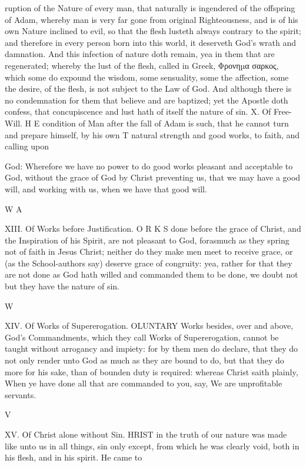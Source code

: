 ruption of the Nature of every man, that naturally is ingendered of the offspring of Adam, whereby man is very far gone from original Righteousness, and is of his own Nature inclined to evil, so that the flesh lusteth always contrary to the spirit; and therefore in every person born into this world, it deserveth God’s wrath and damnation. And this infection of nature doth remain, yea in them that are regenerated; whereby the lust of the flesh, called in Greek, Φρονηµα σαρκος, which some do expound the wisdom, some sensuality, some the affection, some the desire, of the flesh, is not subject to the Law of God. And although there is no condemnation for them that believe and are baptized; yet the Apostle doth confess, that concupiscence and lust hath of itself the nature of sin. X. Of Free-Will. H E condition of Man after the fall of Adam is such, that he cannot turn and prepare himself, by his own T natural strength and good works, to faith, and calling upon

God: Wherefore we have no power to do good works pleasant and acceptable to God, without the grace of God by Christ preventing us, that we may have a good will, and working with us, when we have that good will.

W A

XIII. Of Works before Justification. O R K S done before the grace of Christ, and the Inspiration of his Spirit, are not pleasant to God, forasmuch as they spring not of faith in Jesus Christ; neither do they make men meet to receive grace, or (as the School-authors say) deserve grace of congruity: yea, rather for that they are not done as God hath willed and commanded them to be done, we doubt not but they have the nature of sin.

W

XIV. Of Works of Supererogation. OLUNTARY Works besides, over and above, God’s Commandments, which they call Works of Supererogation, cannot be taught without arrogancy and impiety: for by them men do declare, that they do not only render unto God as much as they are bound to do, but that they do more for his sake, than of bounden duty is required: whereas Christ saith plainly, When ye have done all that are commanded to you, say, We are unprofitable servants.

V

XV. Of Christ alone without Sin. HRIST in the truth of our nature was made like unto us in all things, sin only except, from which he was clearly void, both in his flesh, and in his spirit. He came to


